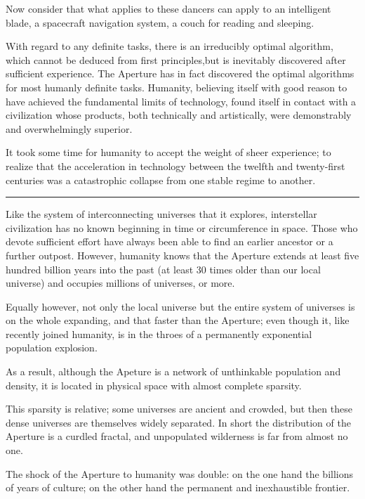 \documentclass[english,11pt,letterpaper,onecolumn]{scrbook}
\begin{document}
	Now consider that what applies to these dancers can apply to an intelligent blade, a spacecraft navigation system, a couch for reading and sleeping.

	With regard to any definite tasks, there is an irreducibly optimal  
algorithm, which cannot be deduced from first principles,but is inevitably 
discovered after sufficient experience.  The Aperture has in fact discovered 
the optimal algorithms for most humanly definite tasks.  Humanity, believing 
itself with good reason to have achieved the fundamental limits of technology, 
found itself in contact with a civilization whose products, both technically 
and artistically, were demonstrably and overwhelmingly superior.

	It took some time for humanity to accept the weight of sheer experience; to realize that the acceleration in technology between the twelfth and twenty-first centuries was a catastrophic collapse from one stable regime to another.

\begin{center}\rule[3pt]{2in}{0.5pt}\end{center}

	Like the system of interconnecting universes that it explores, 
interstellar civilization has no known beginning in time or circumference in 
space.  Those who devote sufficient effort have always been able to find an 
earlier ancestor or a further outpost.  However, humanity knows that the 
Aperture extends at least five hundred billion years into the past (at least 30 
times older than our local universe) and occupies millions of universes, or 
more.

	Equally however, not only the local universe but the entire system of universes is on the whole expanding, and that faster than the Aperture; even though it, like recently joined humanity, is in the throes of a permanently exponential population explosion.

	As a result, although the Apeture is a network of unthinkable population and density, it is located in physical space with almost complete sparsity.

	This sparsity is relative; some universes are ancient and crowded, but then these dense universes are themselves widely separated.  In short the distribution of the Aperture is a curdled fractal, and unpopulated wilderness is far from almost no one.

	The shock of the Aperture to humanity was double:  on the one hand the billions of years of culture; on the other hand the permanent and inexhaustible frontier.
\end{document}
